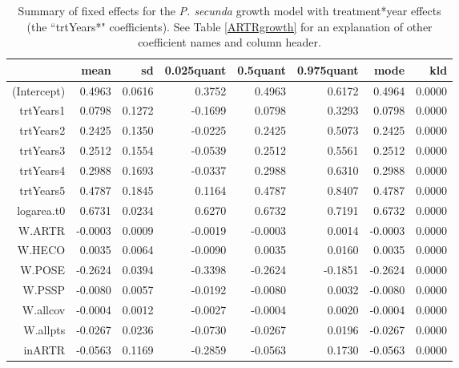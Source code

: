 \documentclass[11pt]{article}
\begin{document}
\begin{table}
\centering
\caption{Summary of fixed effects for the \textit{P. secunda} growth model with treatment*year effects (the ``trtYears*" coefficients). See Table \ref{ARTRgrowth} for an explanation of other coefficient names and column header.} 
\label{table:POSEgrowth-trtYears}
\begin{tabular}{rrrrrrrr}
  \hline
 & mean & sd & 0.025quant & 0.5quant & 0.975quant & mode & kld \\ 
  \hline
(Intercept) & 0.4963 & 0.0616 & 0.3752 & 0.4963 & 0.6172 & 0.4964 & 0.0000 \\ 
  trtYears1 & 0.0798 & 0.1272 & -0.1699 & 0.0798 & 0.3293 & 0.0798 & 0.0000 \\ 
  trtYears2 & 0.2425 & 0.1350 & -0.0225 & 0.2425 & 0.5073 & 0.2425 & 0.0000 \\ 
  trtYears3 & 0.2512 & 0.1554 & -0.0539 & 0.2512 & 0.5561 & 0.2512 & 0.0000 \\ 
  trtYears4 & 0.2988 & 0.1693 & -0.0337 & 0.2988 & 0.6310 & 0.2988 & 0.0000 \\ 
  trtYears5 & 0.4787 & 0.1845 & 0.1164 & 0.4787 & 0.8407 & 0.4787 & 0.0000 \\ 
  logarea.t0 & 0.6731 & 0.0234 & 0.6270 & 0.6732 & 0.7191 & 0.6732 & 0.0000 \\ 
  W.ARTR & -0.0003 & 0.0009 & -0.0019 & -0.0003 & 0.0014 & -0.0003 & 0.0000 \\ 
  W.HECO & 0.0035 & 0.0064 & -0.0090 & 0.0035 & 0.0160 & 0.0035 & 0.0000 \\ 
  W.POSE & -0.2624 & 0.0394 & -0.3398 & -0.2624 & -0.1851 & -0.2624 & 0.0000 \\ 
  W.PSSP & -0.0080 & 0.0057 & -0.0192 & -0.0080 & 0.0032 & -0.0080 & 0.0000 \\ 
  W.allcov & -0.0004 & 0.0012 & -0.0027 & -0.0004 & 0.0020 & -0.0004 & 0.0000 \\ 
  W.allpts & -0.0267 & 0.0236 & -0.0730 & -0.0267 & 0.0196 & -0.0267 & 0.0000 \\ 
  inARTR & -0.0563 & 0.1169 & -0.2859 & -0.0563 & 0.1730 & -0.0563 & 0.0000 \\ 
   \hline
\end{tabular}
\end{table}
\end{document}
